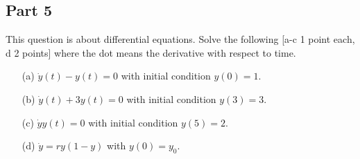 \documentclass[11pt,a4paper]{scrartcl}
\begin{document}
\subsection*{Part 5}
This question is about differential equations. Solve the following [a-c 1 point each, d 2 points] where the dot means the derivative with respect to time.
	\begin{itemize}
		\item[(a)] $\dot{y}(t) - y(t) = 0$ with initial condition $y(0) = 1$.
		\item[(b)] $\dot{y}(t) + 3y(t) = 0$ with initial condition $y(3) = 3$.
		\item[(c)] $\dot{y}y(t) = 0$ with  initial condition $y(5) = 2$.
                  \item[(d)] $\dot{y}=ry(1-y)$ with $y(0)=y_0$. 
	\end{itemize}
\end{document}
